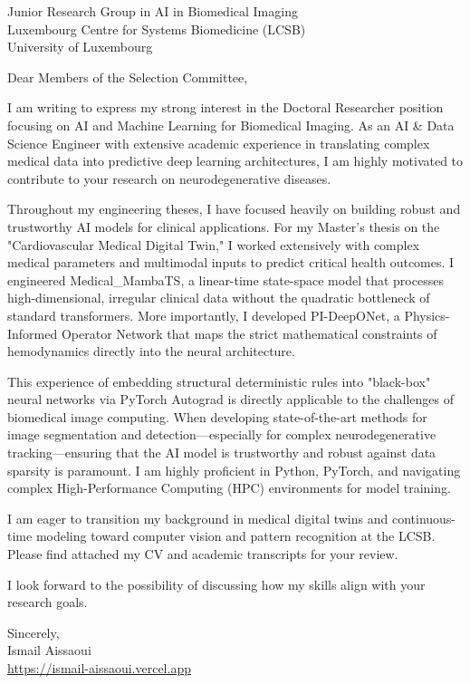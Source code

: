 \documentclass[11pt, a4paper]{letter}
\begin{document}
\begin{letter}{Junior Research Group in AI in Biomedical Imaging \\ Luxembourg Centre for Systems Biomedicine (LCSB) \\ University of Luxembourg}
\opening{Dear Members of the Selection Committee,}

I am writing to express my strong interest in the Doctoral Researcher position focusing on AI and Machine Learning for Biomedical Imaging. As an AI \& Data Science Engineer with extensive academic experience in translating complex medical data into predictive deep learning architectures, I am highly motivated to contribute to your research on neurodegenerative diseases.

Throughout my engineering theses, I have focused heavily on building robust and trustworthy AI models for clinical applications. For my Master's thesis on the "Cardiovascular Medical Digital Twin," I worked extensively with complex medical parameters and multimodal inputs to predict critical health outcomes. I engineered Medical\_MambaTS, a linear-time state-space model that processes high-dimensional, irregular clinical data without the quadratic bottleneck of standard transformers. More importantly, I developed PI-DeepONet, a Physics-Informed Operator Network that maps the strict mathematical constraints of hemodynamics directly into the neural architecture.

This experience of embedding structural deterministic rules into "black-box" neural networks via PyTorch Autograd is directly applicable to the challenges of biomedical image computing. When developing state-of-the-art methods for image segmentation and detection—especially for complex neurodegenerative tracking—ensuring that the AI model is trustworthy and robust against data sparsity is paramount. I am highly proficient in Python, PyTorch, and navigating complex High-Performance Computing (HPC) environments for model training.

I am eager to transition my background in medical digital twins and continuous-time modeling toward computer vision and pattern recognition at the LCSB. Please find attached my CV and academic transcripts for your review.

I look forward to the possibility of discussing how my skills align with your research goals.

\closing{Sincerely, \\ Ismail Aissaoui \\ \href{https://ismail-aissaoui.vercel.app}{https://ismail-aissaoui.vercel.app}}
\end{letter}
\end{document}

